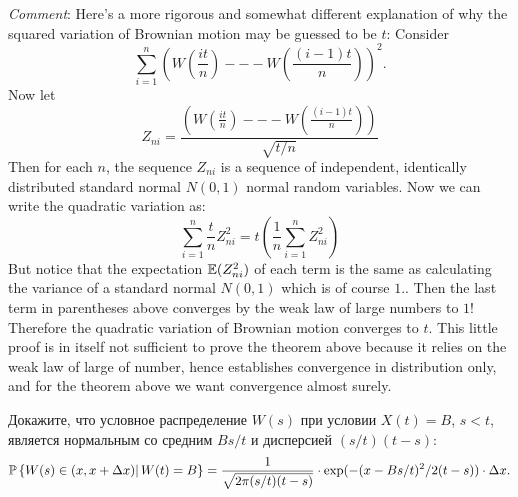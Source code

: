 \begin{solution}
\begin{solution}
\begin{solution}
\begin{solution}
\begin{solution}
\begin{solution}
\begin{solution}
\begin{solution}
\begin{solution}
\begin{solution}
{\begin{problem}
 {\it Comment}:
  Here's a more rigorous and somewhat different explanation of why the squared 
  variation of Brownian motion may be guessed to be $t$:  Consider
  $$
      \sum_{i=1}^{n} \left( W\left( \frac{it}{n} \right) --- W\left(
      \frac{(i-1)t}{n} \right)  \right)^2.
  $$
  Now let
  $$
  Z_{ni} = \frac{ \left( W\left( \frac{it}{n} \right) --- W\left(
      \frac{(i-1)t}{n} \right) \right) }{ \sqrt{t/n} }
  $$
  Then for each $n$, the sequence $Z_{ni}$ is a sequence of independent,
  identically distributed standard normal $N(0,1)$ normal random
  variables.
  Now we can write the quadratic variation as:
  $$
      \sum_{i=1}^{n} \frac{t}{n} Z_{ni}^2 = t \left( \frac{1}{n}
      \sum_{i=1}^{n} Z_{ni}^2 \right)
  $$
  But notice that the expectation $\mathbb{E}(Z_{ni}^2)$ of each term is the same
  as calculating the variance of a standard normal $N(0,1)$ which is of
  course $1$..  Then the last term in parentheses above converges by the weak law of
  large numbers to $1$!  Therefore the quadratic variation of Brownian
  motion converges to $t$.  This little proof is in itself not
  sufficient to prove the theorem above because it relies on the weak
  law of large of number, hence establishes convergence in distribution
  only, and for the theorem above we want convergence almost surely.
\end{problem} 
\begin{solution} 

\end{solution}

\begin{problem}
  Докажите, что условное распределение $W(s)$ при условии $X(t)=B$, 
  $s < t $, является нормальным со средним $B s/t$ и дисперсией $(s/t)(t-s)$:
  $$
    \mathbb{P}\left\{ W(s) \in (x,x+\Delta x) |\, W(t) = B\right\} = 
    \frac{1}{\sqrt{2\pi (s/t)(t-s)}}\cdot \exp(-(x-Bs/t)^2/2(t-s)) \cdot\Delta x.
  $$

\end{problem} 
\begin{solution} 


\end{solution}}
\end{solution}
\end{solution}
\end{solution}
\end{solution}
\end{solution}
\end{solution}
\end{solution}
\end{solution}
\end{solution}
\end{solution}
